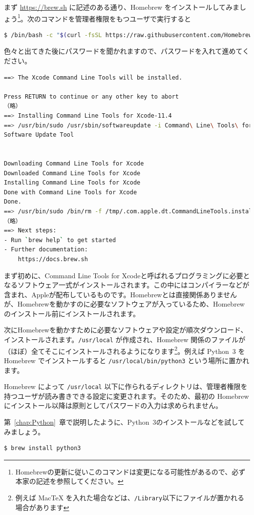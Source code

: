 まず \url{https://brew.sh} に記述のある通り、Homebrew をインストールしてみましょう\footnote{Homebrewの更新に従いこのコマンドは変更になる可能性があるので、必ず本家の記述を参照してください。}。次のコマンドを管理者権限をもつユーザで実行すると
\begin{lstlisting}[language=bash]
$ /bin/bash -c "$(curl -fsSL https://raw.githubusercontent.com/Homebrew/install/master/install.sh)"
\end{lstlisting}
色々と出てきた後にパスワードを聞かれますので、パスワードを入れて進めてください。
\begin{lstlisting}[language=bash]
==> The Xcode Command Line Tools will be installed.

Press RETURN to continue or any other key to abort
（略）
==> Installing Command Line Tools for Xcode-11.4
==> /usr/bin/sudo /usr/sbin/softwareupdate -i Command\ Line\ Tools\ for\ Xcode-11.4
Software Update Tool


Downloading Command Line Tools for Xcode
Downloaded Command Line Tools for Xcode
Installing Command Line Tools for Xcode
Done with Command Line Tools for Xcode
Done.
==> /usr/bin/sudo /bin/rm -f /tmp/.com.apple.dt.CommandLineTools.installondemand.in-progress
（略）
==> Next steps:
- Run `brew help` to get started
- Further documentation: 
    https://docs.brew.sh
\end{lstlisting}
まず初めに、Command Line Tools for Xcodeと呼ばれるプログラミングに必要となるソフトウェア一式がインストールされます。この中にはコンパイラーなどが含まれ、Appleが配布しているものです。Homebrewとは直接関係ありませんが、Homebrewを動かすのに必要なソフトウェアが入っているため、Homebrewのインストール前にインストールされます。

次にHomebrewを動かすために必要なソフトウェアや設定が順次ダウンロード、インストールされます。\texttt{/usr/local} が作成され、Homebrew 関係のファイルが（ほぼ）全てそこにインストールされるようになります\footnote{例えば MacTeX を入れた場合などは、\texttt{/Library}以下にファイルが置かれる場合があります}。例えば Python~3 を Homebrew でインストールすると \texttt{/usr/local/bin/python3} という場所に置かれます。

Homebrew によって \texttt{/usr/local} 以下に作られるディレクトリは、管理者権限を持つユーザが読み書きできる設定に変更されます。そのため、最初の Homebrew にインストール以降は原則としてパスワードの入力は求められません。

第~\ref{chap:Python}~章で説明したように、Python~3のインストールなどを試してみましょう。

\begin{lstlisting}[language=bash]
$ brew install python3
\end{lstlisting}

